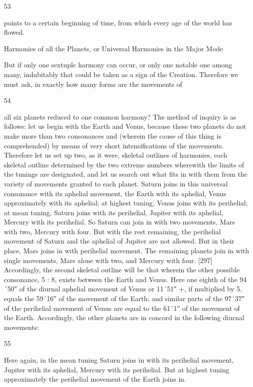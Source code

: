\documentclass{article}
\begin{document}
53

points to a certain beginning of time, from which every age of the world
has flowed.

Harmonies of all the Planets, or Universal Harmonies in the Major Mode

But if only one sextuple harmony can occur, or only one notable one
among many, indubitably that could be taken as a sign of the Creation.
Therefore we must ask, in exactly how many forms are the movements of


54

all six planets reduced to one common harmony? The method of inquiry
is as follows: let us begin with the Earth and Venus, because these two
planets do not make more than two consonances and (wherein the cause
of this thing is comprehended) by means of very short intensifications of
the movements.
Therefore let us set up two, as it were, skeletal outlines of harmonies,
each skeletal outline determined by the two extreme numbers wherewith
the limits of the tunings are designated, and let us search out what fits in
with them from the variety of movements granted to each planet.
Saturn joins in this universal consonance with its aphelial movement,
the Earth with its aphelial, Venus approximately with its aphelial; at
highest tuning, Venus joins with its perihelial; at mean tuning, Saturn
joins with its perihelial, Jupiter with its aphelial, Mercury with its
perihelial. So Saturn can join in with two movements, Mars with two,
Mercury with four. But with the rest remaining, the perihelial movement
of Saturn and the aphelial of Jupiter are not allowed. But in their place,
Mars joins in with perihelial movement.
The remaining planets join in with single movements, Mars alone with
two, and Mercury with four.
[297] Accordingly, the second skeletal outline will be that wherein the
other possible consonance, 5 : 8, exists between the Earth and Venus.
Here one eighth of the 94´50″ of the diurnal aphelial movement of
Venus or 11´51″ +, if multiplied by 5, equals the 59´16″ of the movement
of the Earth; and similar parts of the 97´37″ of the perihelial movement
of Venus are equal to the 61´1″ of the movement of the Earth.
Accordingly, the other planets are in concord in the following diurnal
movements:


55

Here again, in the mean tuning Saturn joins in with its perihelial
movement, Jupiter with its aphelial, Mercury with its perihelial. But at
highest tuning approximately the perihelial movement of the Earth joins
in.
\end{document}
